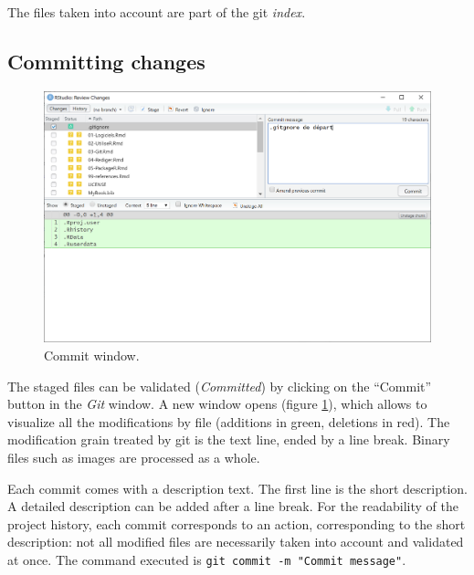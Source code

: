 \documentclass[
  12pt,
  american,
  a4paper,
  extrafontsizes,onecolumn,openright
  ]{memoir}
\begin{document}
The files taken into account are part of the git \emph{index}.

\hypertarget{committing-changes}{%
\subsection{Committing changes}\label{committing-changes}}



\scriptsize

\begin{figure}

{\centering \includegraphics[width=0.8\linewidth]{images/git-Commit} 

}

\caption{Commit window.}\label{fig:git-Commit}
\end{figure}

\normalsize

The staged files can be validated (\emph{Committed}) by clicking on the \enquote{Commit} button in the \emph{Git} window.
A new window opens (figure \ref{fig:git-Commit}), which allows to visualize all the modifications by file (additions in green, deletions in red).
The modification grain treated by git is the text line, ended by a line break.
Binary files such as images are processed as a whole.

Each commit comes with a description text.
The first line is the short description.
A detailed description can be added after a line break.
For the readability of the project history, each commit corresponds to an action, corresponding to the short description: not all modified files are necessarily taken into account and validated at once.
The command executed is \texttt{git\ commit\ -m\ "Commit\ message"}.



\scriptsize
\end{document}
